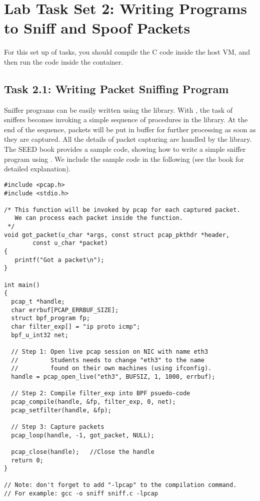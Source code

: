 \section{Lab Task Set 2: Writing Programs to Sniff and Spoof Packets}

For this set up of tasks, you should compile the C code 
inside the host VM, and then run the code inside the container. 

\subsection{Task 2.1: Writing Packet Sniffing Program}

Sniffer programs can be easily written using the \pcap library. With \pcap, 
the task of 
sniffers becomes invoking a simple sequence of procedures
in the \pcap library. At the end of the sequence,
packets will be put in buffer for further processing
as soon as they are captured. All the details 
of packet capturing are handled by the \pcap library.
The SEED book provides a sample code, showing how  to write a simple sniffer program using 
\pcap. We include the sample code in the following (see the book for detailed explanation). 

\begin{lstlisting}
#include <pcap.h>
#include <stdio.h>

/* This function will be invoked by pcap for each captured packet.
   We can process each packet inside the function.  
 */
void got_packet(u_char *args, const struct pcap_pkthdr *header,
        const u_char *packet)
{
   printf("Got a packet\n");
}

int main()
{
  pcap_t *handle;
  char errbuf[PCAP_ERRBUF_SIZE];
  struct bpf_program fp;
  char filter_exp[] = "ip proto icmp";
  bpf_u_int32 net;

  // Step 1: Open live pcap session on NIC with name eth3
  //         Students needs to change "eth3" to the name 
  //         found on their own machines (using ifconfig).
  handle = pcap_open_live("eth3", BUFSIZ, 1, 1000, errbuf); 

  // Step 2: Compile filter_exp into BPF psuedo-code
  pcap_compile(handle, &fp, filter_exp, 0, net);            
  pcap_setfilter(handle, &fp);                              

  // Step 3: Capture packets
  pcap_loop(handle, -1, got_packet, NULL);                  

  pcap_close(handle);   //Close the handle
  return 0;
}

// Note: don't forget to add "-lpcap" to the compilation command.
// For example: gcc -o sniff sniff.c -lpcap
\end{lstlisting}



